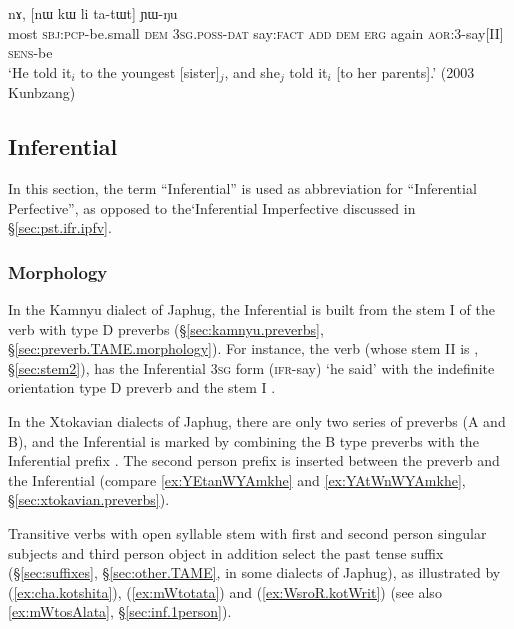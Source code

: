 \begin{exe}
\ex \label{ex:ti.nA.tatWt}
 nɤ, [nɯ kɯ li ta-tɯt] ɲɯ-ŋu \\
most \textsc{sbj}:\textsc{pcp}-be.small \textsc{dem} \textsc{3sg}.\textsc{poss}-\textsc{dat} say:\textsc{fact} \textsc{add} \textsc{dem} \textsc{erg} again \textsc{aor}:3\flobv{}-say[II] \textsc{sens}-be \\
\glt `He told it$_i$ to the youngest [sister]$_j$, and she$_j$ told it$_i$ [to her parents].' (2003 Kunbzang)
\end{exe}
 
\subsection{Inferential} \label{sec:ifr}
In this section, the term ``Inferential'' is used as abbreviation for ``Inferential Perfective'', as opposed to the`Inferential Imperfective discussed in §\ref{sec:pst.ifr.ipfv}.

\subsubsection{Morphology}   \label{sec:ifr.morphology}
In the Kamnyu dialect of Japhug, the Inferential is built from the stem I of the verb with type D preverbs (§\ref{sec:kamnyu.preverbs}, §\ref{sec:preverb.TAME.morphology}). For instance, the verb  (whose stem II is , §\ref{sec:stem2}), has the Inferential \textsc{3sg} form  (\textsc{ifr}-say) `he said' with the indefinite orientation type D preverb  and the stem I .

In the Xtokavian dialects of Japhug, there are only two series of preverbs (A and B), and the Inferential is marked by combining the B type preverbs with the Inferential prefix . The second person prefix  is inserted between the preverb and the Inferential  (compare \ref{ex:YEtanWYAmkhe} and \ref{ex:YAtWnWYAmkhe}, §\ref{sec:xtokavian.preverbs}).

Transitive verbs with open syllable stem with first  and second person singular subjects and third person object in addition select the  past tense suffix (§\ref{sec:suffixes}, §\ref{sec:other.TAME},  in some dialects of Japhug), as illustrated by (\ref{ex:cha.kotshita}), (\ref{ex:mWtotata}) and (\ref{ex:WsroR.kotWrit}) (see also \ref{ex:mWtosAlata}, §\ref{sec:inf.1person}).


